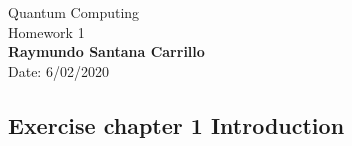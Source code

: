 \documentclass{article}
\begin{document}

\begin{center}
{\Large Quantum Computing \hspace{0.5cm} \\Homework 1}\\
\textbf{Raymundo Santana Carrillo}\\ %
Date: 6/02/2020 %
\end{center}


   


\subsection*{Exercise chapter 1 Introduction}
\end{document}
